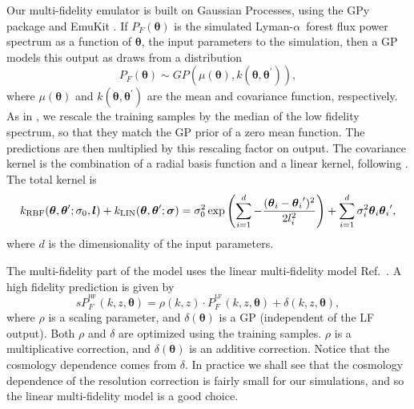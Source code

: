 \documentclass[a4paper,11pt]{article}
\newcommand{\Lya}{Lyman-$\alpha$}
\begin{document}
Our multi-fidelity emulator is built on Gaussian Processes, using the GPy
package \cite{gpy2014} and EmuKit \cite{2021arXiv211013293P}. If $P_F(\boldsymbol{\theta})$ is the simulated \Lya~forest flux power spectrum as a function of $\boldsymbol{\theta}$, the input parameters to the simulation, then a GP models this output as draws from a distribution
\begin{equation}
    P_F(\boldsymbol{\theta}) \sim GP(\mu(\boldsymbol{\theta}), k(\boldsymbol{\theta}, \boldsymbol{\theta}^{\prime})),
\end{equation}
where $\mu(\boldsymbol{\theta})$ and $k(\boldsymbol{\theta}, \boldsymbol{\theta}^{\prime})$ are the mean and covariance function, respectively.
As in \cite{Fernandez:2022}, we rescale the training samples by the median of the low fidelity spectrum, so that they match the GP prior of a zero mean function. The predictions are then multiplied by this rescaling factor on output. The covariance kernel is the combination of a radial basis function and a linear kernel, following \cite{Fernandez:2022}. The total kernel is
\begin{equation}
        k_\mathrm{RBF}(\boldsymbol{\theta}, \boldsymbol{\theta}'; \sigma_0, \boldsymbol{l}) + k_\mathrm{LIN}(\boldsymbol{\theta}, \boldsymbol{\theta}'; \boldsymbol{\sigma})\\
        = \sigma_0^2 \exp{\left( \sum_{i=1}^{d} -\frac{(\boldsymbol{\theta}_i - {\boldsymbol{\theta}_i}')^2}{2 l_i^2} \right)} +  \sum_{i=1}^{d} \sigma_i^2 \boldsymbol{\theta}_i {\boldsymbol{\theta}_i}',
\end{equation}
where $d$ is the dimensionality of the input parameters.

The multi-fidelity part of the model uses the linear multi-fidelity model Ref.~\citep{10.1093/biomet/87.1.1}. A high fidelity prediction is given by
\begin{equation}s
    P_F^{^\mathrm{HF}}(k, z, \boldsymbol{\theta}) = \rho(k, z) \cdot P_F^{^\mathrm{LF}}(k, z, \boldsymbol{\theta}) + \delta(k, z, \boldsymbol{\theta}),
    \label{eq:ko_model}
\end{equation}
where $\rho$ is a scaling parameter, and $\delta(\boldsymbol{\theta})$ is a GP (independent of the LF output). Both $\rho$ and $\delta$ are optimized using the training samples. $\rho$ is a multiplicative correction, and $\delta(\boldsymbol{\theta})$ is an additive correction. Notice that the cosmology dependence comes from $\delta$. In practice we shall see that the cosmology dependence of the resolution correction is fairly small for our simulations, and so the linear multi-fidelity model is a good choice.
\end{document}
